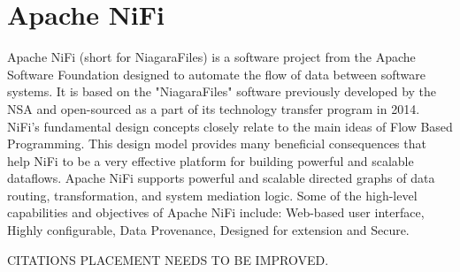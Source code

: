 \section{Apache NiFi}
Apache NiFi (short for NiagaraFiles) is a software project from the Apache
Software Foundation designed to automate the flow of data between software
systems. It is based on the "NiagaraFiles" software previously developed by
the NSA and open-sourced as a part of its technology transfer program in 2014.
\cite{nifi-wiki} NiFi's fundamental design concepts closely relate to the main
ideas of Flow Based Programming. This design model provides many beneficial
consequences that help NiFi to be a very effective platform for building
powerful and scalable dataflows. Apache NiFi supports powerful and scalable
directed graphs of data routing, transformation, and system mediation
logic.\cite{ nifi-overview} Some of the high-level capabilities and objectives
of Apache NiFi include: Web-based user interface, Highly configurable, Data
Provenance, Designed for extension and Secure. \cite{nifi-web}
 
CITATIONS PLACEMENT NEEDS TO BE IMPROVED.

